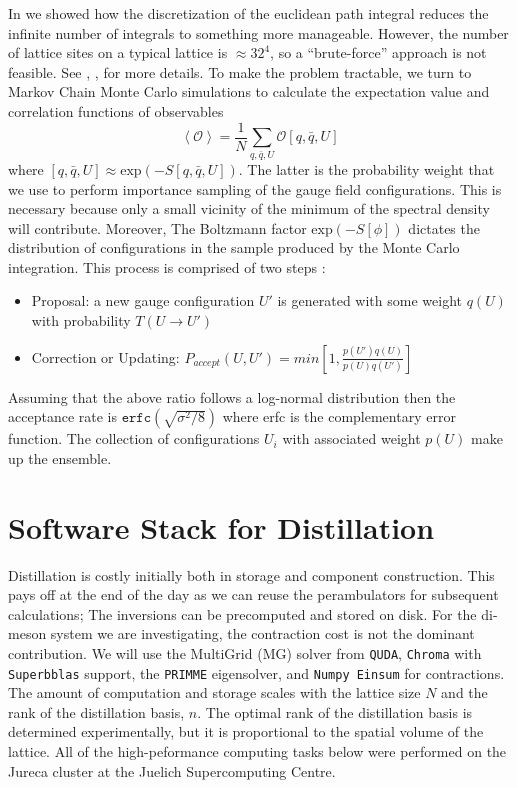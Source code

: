 In  we showed how the discretization of the euclidean path integral reduces the infinite number of integrals to something more manageable. However, the number of lattice sites on a typical lattice is $\approx32^4$, so a ``brute-force'' approach is not feasible. See \cite{Montvay_Münster_1994}, \cite{Luscher:2010ae},\cite{Creutz:1988wv} \cite{Finkenrath:2023sjg} for more details. To make the problem tractable, we turn to Markov Chain Monte Carlo simulations to calculate the expectation value and correlation functions of observables 
\begin{equation}
  \left<\mathcal{O}\right> = \frac{1}{N} \sum_{q,\bar{q},U}^{} \mathcal{O}\left[q,\bar{q},U\right] 
\end{equation} where $\left[q,\bar{q},U\right] \approx \text{exp}(-S[q,\bar{q},U])$. The latter is the probability weight that we use to perform importance sampling of the gauge field configurations. This is necessary because only a small vicinity of the minimum of the spectral density will contribute. Moreover, The Boltzmann factor $\text{exp}(-S[\phi])$ dictates the distribution of configurations in the sample produced by the Monte Carlo integration. This process is comprised of two steps \cite{Luscher:2010ae}: 
\begin{itemize}
  \item Proposal: a new gauge configuration $U'$ is generated with some weight $q(U)$ with probability $T(U \to U')$ 
  \item Correction or Updating: $P_{accept}(U,U') = min \left[1,\frac{p(U')q(U)}{p(U)q(U')}\right]$
\end{itemize} 
Assuming that the above ratio follows a log-normal distribution then the acceptance rate is $\texttt{erfc}\left(\sqrt{\sigma^2/8}\right)$ where erfc is the complementary error function. The collection of configurations $U_i$ with associated weight $p(U)$ make up the ensemble. 


\section{Software Stack for Distillation}
Distillation is costly initially both in storage and component construction. This pays off at the end of the day as we can reuse the perambulators for subsequent calculations; The inversions can be precomputed and stored on disk. For the di-meson system we are investigating, the contraction cost is not the dominant contribution. We will use the MultiGrid (MG) solver from \texttt{QUDA}, \texttt{Chroma} with \texttt{Superbblas} support, the \texttt{PRIMME} eigensolver, and \texttt{Numpy Einsum} for contractions. The amount of computation and storage scales with the lattice size $N$ and the rank of the distillation basis, $n$. The optimal rank of the distillation basis is determined experimentally, but it is proportional to the spatial volume of the lattice. All of the high-peformance computing tasks below were performed on the Jureca cluster at the Juelich Supercomputing Centre. 
